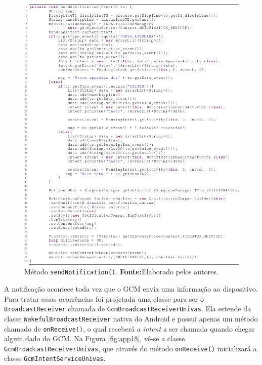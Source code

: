	\begin{figure}[h!] 
		\centerline{\includegraphics[scale=.80]{./imagens/2_q_metodologico/4_procedimentos_resultados/42_aplicativo/send1.png}}
		\caption[Método sendNotification()]{ Método \texttt{sendNotification()}.
		\textbf{Fonte:}Elaborado pelos autores.}
		\label{fig:app17}
	\end{figure}
	
	\pagebreak
	
	\par A notificação acontece toda vez que o GCM envia uma informação ao
dispositivo. Para tratar essas ocorrências foi projetada uma classe para ser o
\texttt{BroadcastReceiver} chamada de \texttt{GcmBroadcastReceiverUnivas}. Ela
estende da classe \texttt{WakefulBroadcastReceiver} nativa do Android e possui
apenas um método chamado de \texttt{onReceive()}, o qual receberá a
\textit{intent} a ser chamada quando chegar algum dado do GCM. Na Figura
\ref{fig:app18}, vê-se a classe \texttt{GcmBroadcastReceiverUnivas}, que
através do método \texttt{onReceive()} inicializará a classe
\texttt{GcmIntentServiceUnivas}.

